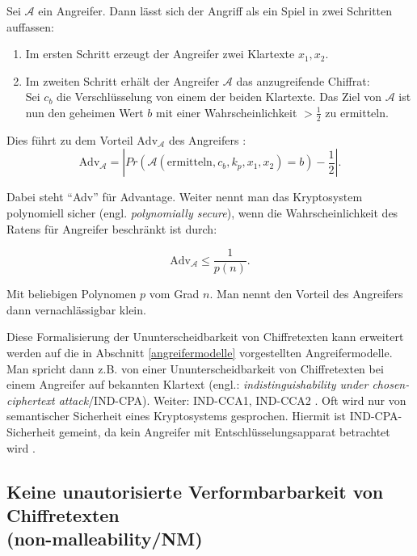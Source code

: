 Sei $\mathcal{A}$ ein Angreifer. Dann lässt sich der Angriff als ein Spiel in zwei Schritten auffassen:

\begin{enumerate}
	\item Im ersten Schritt erzeugt der Angreifer zwei Klartexte $x_1, x_2$. 
	\item Im zweiten Schritt erhält der Angreifer $\mathcal{A}$ das anzugreifende Chiffrat:\\
	Sei $c_b$ die Verschlüsselung von einem der beiden Klartexte. Das Ziel von $\mathcal{A}$ ist nun  den geheimen Wert $b$ mit einer Wahrscheinlichkeit $>\frac{1}{2}$ zu ermitteln.
\end{enumerate}

Dies führt zu dem Vorteil $\text{Adv}_\mathcal{A}$ des Angreifers \cite[p.291]{smart2003}:
\begin{equation*}
\text{Adv}_\mathcal{A} = \left| Pr\left(\mathcal{A}(\text{ermitteln},c_b,k_p,x_1,x_2)=b\right)-\frac{1}{2}  \right|.
\end{equation*}

Dabei steht \enquote{Adv} für Advantage. Weiter nennt man das Kryptosystem polynomiell sicher (engl. \textit{polynomially secure}), wenn die Wahrscheinlichkeit des Ratens für Angreifer beschränkt ist durch:

\begin{equation*}
\text{Adv}_\mathcal{A}  \leq \frac{1}{p(n)}.
\end{equation*}

Mit beliebigen Polynomen $p$ vom Grad $n$. Man nennt den Vorteil des Angreifers dann vernachlässigbar klein.

Diese Formalisierung der Ununterscheidbarkeit von Chiffretexten kann erweitert werden auf die in Abschnitt \ref{angreifermodelle} vorgestellten Angreifermodelle. Man spricht dann z.B. von einer Ununterscheidbarkeit von Chiffretexten bei einem Angreifer auf bekannten Klartext (engl.: \textit{indistinguishability under chosen-ciphertext attack}/IND-CPA). Weiter: IND-CCA1, IND-CCA2 \cite[p.33]{bellare1998relations}. Oft wird nur von semantischer Sicherheit eines Kryptosystems gesprochen. Hiermit ist IND-CPA-Sicherheit gemeint, da kein Angreifer mit Entschlüsselungsapparat betrachtet wird \cite[p.27]{dolev2003nonmalleable}.

\subsection[Keine unautorisierte Verformbarkeit von Chiffretexten (non-malleability/NM)]{\texorpdfstring{Keine unautorisierte Verformbarbarkeit von Chiffretexten\\ (non-malleability/NM)}{Keine unautorisierte Verformbarkeit von Chiffretexten (non-malleability/NM)}}
\label{malleability}

